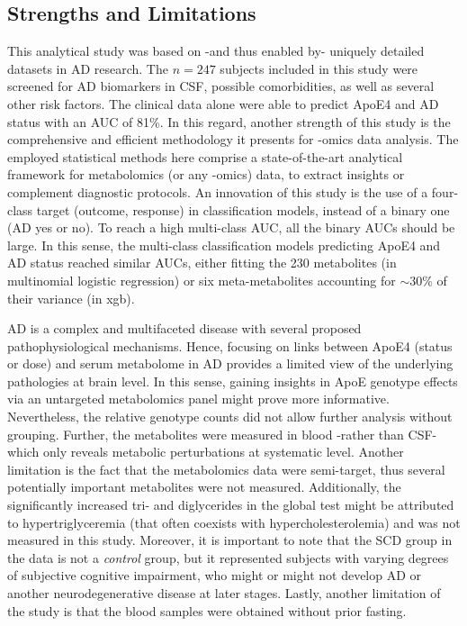 \documentclass{amsart}
\begin{document}
\subsection{Strengths and Limitations} This analytical study was based on -and thus enabled by- uniquely detailed datasets in AD research. The $n = 247$ subjects included in this study were screened for AD biomarkers in CSF, possible comorbidities, as well as several other risk factors. The clinical data alone were able to predict ApoE4 and AD status with an AUC of 81\%. In this regard, another strength of this study is the comprehensive and efficient methodology it presents for -omics data analysis. The employed statistical methods here comprise a state-of-the-art analytical framework for metabolomics (or any -omics) data, to extract insights or complement diagnostic protocols. An innovation of this study is the use of a four-class target (outcome, response) in classification models, instead of a binary one (AD yes or no). To reach a high multi-class AUC, all the binary AUCs should be large. In this sense, the multi-class classification models predicting ApoE4 and AD status reached similar AUCs, either fitting the 230 metabolites (in multinomial logistic regression) or six meta-metabolites accounting for $\sim$30\% of their variance (in \acrlong{xgb}).

AD is a complex and multifaceted disease with several proposed pathophysiological mechanisms. Hence, focusing on links between ApoE4 (status or dose) and serum metabolome in AD provides a limited view of the underlying pathologies at brain level. In this sense, gaining insights in ApoE genotype effects via an untargeted metabolomics panel might prove more informative. Nevertheless, the relative genotype counts did not allow further analysis without grouping. Further, the metabolites were measured in blood -rather than CSF- which only reveals metabolic perturbations at systematic level. Another limitation is the fact that the metabolomics data were semi-target, thus several potentially important metabolites were not measured. Additionally, the significantly increased tri- and diglycerides in the global test might be attributed to hypertriglyceremia (that often coexists with hypercholesterolemia) and was not measured in this study. Moreover, it is important to note that the SCD group in the data is not a \textit{control} group, but it represented subjects with varying degrees of subjective cognitive impairment, who might or  might not develop AD or another neurodegenerative disease at later stages. Lastly, another limitation of the study is that the blood samples were obtained without prior fasting.
\end{document}
